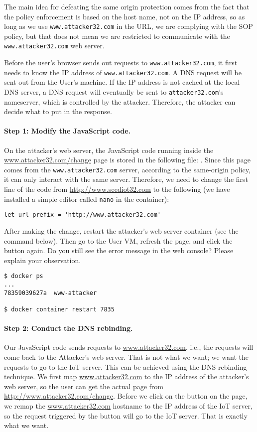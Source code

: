 The main idea for defeating the same origin protection 
comes from the fact that the policy enforcement is 
based on the host name, not on the IP address, so as long as 
we use \texttt{www.attacker32.com} in the URL, we are complying with
the SOP policy, but that does not mean we are restricted 
to communicate with the \texttt{www.attacker32.com} web server.  


Before the user's browser sends out requests to \texttt{www.attacker32.com},
it first needs to know the IP address of \texttt{www.attacker32.com}. 
A DNS request will be sent out from the User's machine. If the 
IP address is not cached at the local DNS server, a DNS request will
eventually be sent to \texttt{attacker32.com}'s  nameserver, which 
is controlled by the attacker. 
Therefore, the attacker can decide what to put in the response. 


\paragraph{Step 1: Modify the JavaScript code.}
On the attacker's web server, the JavaScript code running inside the 
\url{www.attacker32.com/change} page is 
stored in the following file: 
. Since this page
comes from the \texttt{www.attacker32.com} server, 
according to the same-origin policy, it can only
interact with the same server. Therefore, we need to change the first 
line of the code from \url{http://www.seediot32.com} 
to the following (we have installed a simple editor called \texttt{nano}
in the container):

\begin{lstlisting}
let url_prefix = 'http://www.attacker32.com'
\end{lstlisting}
 

After making the change, restart the attacker's web server container (see the 
command below). Then go to the User VM, refresh the page, and click the button again. 
Do you still see the error
message in the web console? Please explain your observation. 


\begin{lstlisting}
$ docker ps
...
78359039627a  www-attacker

$ docker container restart 7835
\end{lstlisting}
 


\paragraph{Step 2: Conduct the DNS rebinding.}
Our JavaScript code sends requests to \url{www.attacker32.com}, 
i.e., the requests will come back to the Attacker's web server. That is not 
what we want; we want the requests to go to the IoT server. 
This can be achieved using the DNS rebinding 
technique. We first map \url{www.attacker32.com} to the IP address of the attacker's
web server, so
the user can get the actual page from \url{http://www.attacker32.com/change}. 
Before we click on the button on the page, we remap
the \url{www.attacker32.com} hostname to the IP address of the IoT server, so
the request triggered by the button will go to the IoT server. That is exactly what 
we want. 


